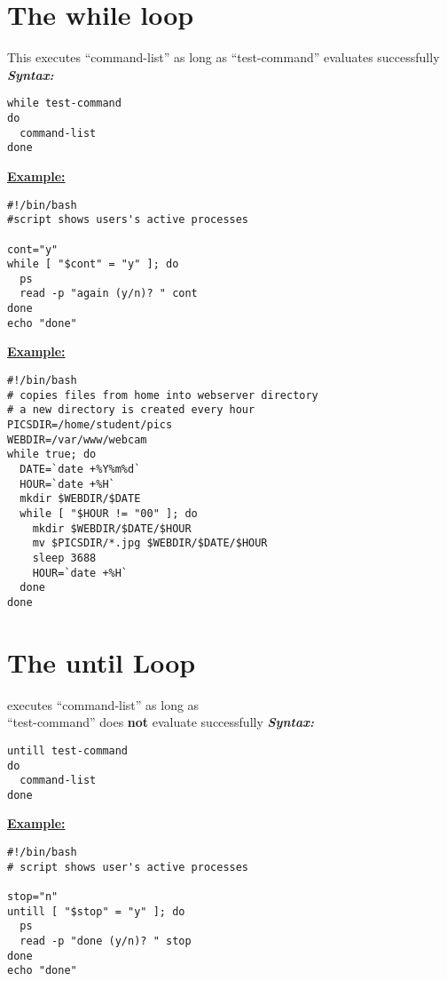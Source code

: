 \documentclass{report}
\begin{document}
\section{The while loop}
This executes ``command-list'' as long as ``test-command'' evaluates successfully
\bigbreak \noindent
\textit{\textbf{Syntax:}}
\begin{verbatim}
while test-command
do
  command-list
done
\end{verbatim}
\bigbreak \noindent
\textbf{\underline{Example:}}
\begin{mdframed}
\begin{verbatim}
#!/bin/bash
#script shows users's active processes

cont="y"
while [ "$cont" = "y" ]; do
  ps
  read -p "again (y/n)? " cont
done
echo "done"

\end{verbatim}
\end{mdframed}
\bigbreak \noindent
\textbf{\underline{Example:}}
\begin{mdframed}
\begin{verbatim}
#!/bin/bash
# copies files from home into webserver directory
# a new directory is created every hour
PICSDIR=/home/student/pics
WEBDIR=/var/www/webcam
while true; do
  DATE=`date +%Y%m%d` 
  HOUR=`date +%H`
  mkdir $WEBDIR/$DATE 
  while [ "$HOUR != "00" ]; do
    mkdir $WEBDIR/$DATE/$HOUR
    mv $PICSDIR/*.jpg $WEBDIR/$DATE/$HOUR
    sleep 3688
    HOUR=`date +%H`
  done
done
\end{verbatim}
\end{mdframed}
\section{The until Loop}
executes ``command-list'' as long as \\ ``test-command'' does \textbf{not} evaluate successfully
\bigbreak \noindent
\textit{\textbf{Syntax:}}
  \begin{verbatim}
untill test-command
do
  command-list
done
\end{verbatim}
\bigbreak \noindent
\textbf{\underline{Example:}}
\begin{mdframed}
  \begin{verbatim}
#!/bin/bash
# script shows user's active processes

stop="n"
untill [ "$stop" = "y" ]; do
  ps
  read -p "done (y/n)? " stop
done
echo "done"
\end{verbatim}
\end{mdframed}
\end{document}
